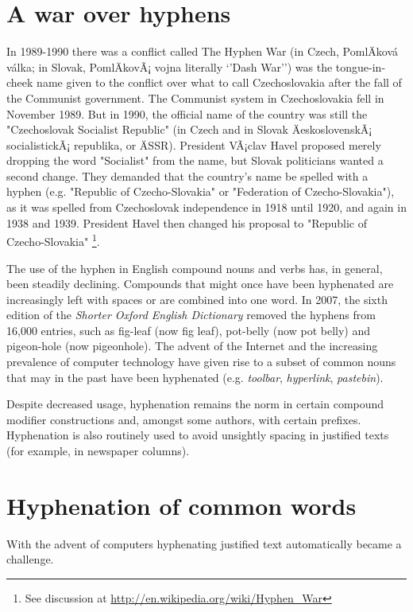 {\section*{A war over hyphens}
In 1989-1990 there was a conflict called The Hyphen War (in Czech, PomlÄkov\'a v\' alka; in Slovak, PomlÄkovÃ¡ vojna literally `'Dash War'') was the tongue-in-cheek name given to the conflict over what to call Czechoslovakia after the fall of the Communist government. The Communist system in Czechoslovakia fell in November 1989. But in 1990, the official name of the country was still the "Czechoslovak Socialist Republic" (in Czech and in Slovak ÄeskoslovenskÃ¡ socialistickÃ¡ republika, or ÄSSR). President VÃ¡clav Havel proposed merely dropping the word "Socialist" from the name, but Slovak politicians wanted a second change. They demanded that the country's name be spelled with a hyphen (e.g. "Republic of Czecho-Slovakia" or "Federation of Czecho-Slovakia"), as it was spelled from Czechoslovak independence in 1918 until 1920, and again in 1938 and 1939. President Havel then changed his proposal to "Republic of Czecho-Slovakia" \footnote{See discussion at \url{http://en.wikipedia.org/wiki/Hyphen_War}}. 

The use of the hyphen in English compound nouns and verbs has, in general, been steadily declining. Compounds that might once have been hyphenated are increasingly left with spaces or are combined into one word. In 2007, the sixth edition of the \textit{Shorter Oxford English Dictionary} removed the hyphens from 16,000 entries, such as fig-leaf (now fig leaf), pot-belly (now pot belly) and pigeon-hole (now pigeonhole). The advent of the Internet and the increasing prevalence of computer technology have given rise to a subset of common nouns that may in the past have been hyphenated (e.g. \textit{toolbar}, \textit{hyperlink}, \textit{pastebin}).

Despite decreased usage, hyphenation remains the norm in certain compound modifier constructions and, amongst some authors, with certain prefixes. Hyphenation is also routinely used to avoid unsightly spacing in justified texts (for example, in newspaper columns). 

\section*{Hyphenation of common words}
With the advent of computers hyphenating justified text automatically became a challenge.


}

